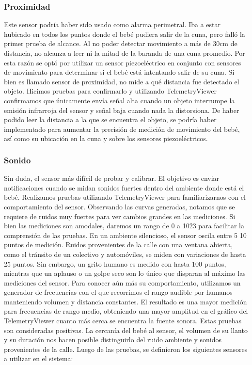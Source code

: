 \documentclass{IEEEtran}
\begin{document}
			\subsubsection{Proximidad}

				Este sensor podría haber sido usado como alarma perimetral. Iba a estar hubicado en todos los puntos donde el bebé pudiera salir de la cuna, pero falló la primer prueba de alcance. Al no poder detectar movimiento a más de 30cm de distancia, no alcanza a leer ni la mitad de la baranda de una cuna promedio.
				Por esta razón se optó por utilizar un sensor piezoeléctrico en conjunto con sensores de movimiento para determinar si el bebé está intentando salir de su cuna.
				Si bien es llamado sensor de proximidad, no mide a qué distancia fue detectado el objeto. Hicimos pruebas para confirmarlo y utilizando TelemetryViewer confirmamos que únicamente envía señal alta cuando un objeto interrumpe la emisión infrarroja del sensor y señal baja cuando nada la distorsiona. De haber podido leer la distancia a la que se encuentra el objeto, se podría haber implementado para aumentar la precisión de medición de movimiento del bebé, así como su ubicación en la cuna y sobre los sensores piezoeléctricos.

			\subsubsection{Sonido}
				Sin duda, el sensor más difícil de probar y calibrar. El objetivo es enviar notificaciones cuando se midan sonidos fuertes dentro del ambiente donde está el bebé.
				Realizamos pruebas utilizando TelemetryViewer para familiarizarnos con el comportamiento del sensor. Observando las curvas generadas, notamos que se requiere de ruidos muy fuertes para ver cambios grandes en las mediciones. Si bien las mediciones son amodales, daremos un rango de 0 a 1023 para facilitar la comprensión de las pruebas.
				En un ambiente silencioso, el sensor oscila entre 5 10 puntos de medición. Ruidos provenientes de la calle con una ventana abierta, como el tránsito de un colectivo y automóviles, se miden con variaciones de hasta 25 puntos. Sin embargo, un grito humano es medido con hasta 100 puntos, mientras que un aplauso o un golpe seco son lo único que disparan al máximo las mediciones del sensor.
				Para conocer aún más su comportamiento, utilizamos un generador de frecuencias con el que recorrimos el rango audible por humanos manteniendo volumen y distancia constantes. El resultado es una mayor medición para frecuencias de rango medio, obteniendo una mayor amplitud en el gráfico del TelemetryViewer cuanto más cerca se encuentra la fuente sonora.
				Estas pruebas son consideradas positivas. La cercanía del bebé al sensor, el volumen de su llanto y su duración nos hacen posible distinguirlo del ruido ambiente y sonidos provenientes de la calle.
				Luego de las pruebas, se definieron los siguientes sensores a utilizar en el sistema:
\end{document}
